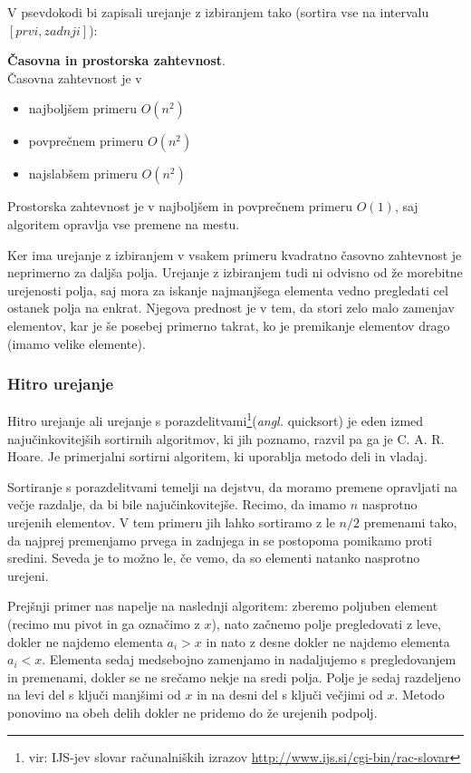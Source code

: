 \documentclass[a4paper,oneside]{article}
\begin{document}
V psevdokodi bi zapisali urejanje z izbiranjem tako (sortira vse na intervalu
$\left[prvi, zadnji\right]$):



\textbf{Časovna in prostorska zahtevnost}. \\
Časovna zahtevnost je v 
\begin{itemize}
  \item najboljšem primeru $O(n^2)$
  \item povprečnem primeru $O(n^2)$
  \item najslabšem primeru $O(n^2)$
\end{itemize}

Prostorska zahtevnost je v najboljšem in povprečnem primeru $O(1)$, 
saj algoritem opravlja vse premene na mestu.

Ker ima urejanje z izbiranjem v vsakem primeru kvadratno časovno zahtevnost je neprimerno
za daljša polja. Urejanje z izbiranjem tudi ni odvisno od že morebitne urejenosti polja,
saj mora za iskanje najmanjšega elementa vedno pregledati cel ostanek polja na enkrat.
Njegova prednost je v tem, da stori zelo malo zamenjav elementov, kar je še posebej
primerno takrat, ko je premikanje elementov drago (imamo velike elemente).

\subsubsection{Hitro urejanje}
\label{chapter:quicksort}
Hitro urejanje ali urejanje s porazdelitvami\footnote{vir: IJS-jev slovar računalniških izrazov
\url{http://www.ijs.si/cgi-bin/rac-slovar}}(\emph{angl.} quicksort) je eden izmed
najučinkovitejših sortirnih algoritmov, ki jih poznamo, razvil pa ga je C. A. R. Hoare.
Je primerjalni sortirni algoritem, ki uporablja metodo deli in vladaj.

Sortiranje s porazdelitvami temelji na dejstvu, da moramo premene opravljati na večje
razdalje, da bi bile najučinkovitejše. Recimo, da imamo $n$ nasprotno urejenih elementov.
V tem primeru jih lahko sortiramo z le $n/2$ premenami tako, da najprej premenjamo prvega
in zadnjega in se postopoma pomikamo proti sredini. Seveda je to možno le, če vemo, da so 
elementi natanko nasprotno urejeni.

Prejšnji primer nas napelje na naslednji algoritem: 
zberemo poljuben element (recimo mu pivot in ga označimo z $x$), nato začnemo 
polje pregledovati z leve, dokler ne najdemo elementa $a_i > x$ in nato z desne dokler ne 
najdemo elementa $a_i < x$. Elementa sedaj medsebojno zamenjamo in nadaljujemo s 
pregledovanjem in premenami, dokler se ne srečamo nekje na sredi polja.
Polje je sedaj razdeljeno na levi del s ključi manjšimi od $x$ in na desni del
s ključi večjimi od $x$. Metodo ponovimo na obeh delih dokler ne pridemo do že urejenih
podpolj. 
\end{document}

